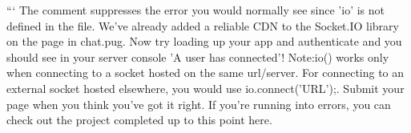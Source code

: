 \documentclass{article}%
\begin{document}
```\newline%
The comment suppresses the error you would normally see since 'io' is not defined in the file. We've already added a reliable CDN to the Socket.IO library on the page in chat.pug.\newline%
Now try loading up your app and authenticate and you should see in your server console 'A user has connected'!\newline%
Note:io() works only when connecting to a socket hosted on the same url/server. For connecting to an external socket hosted elsewhere, you would use io.connect('URL');.\newline%
Submit your page when you think you've got it right. If you're running into errors, you can check out the project completed up to this point here.\newline%

%
\end{document}
